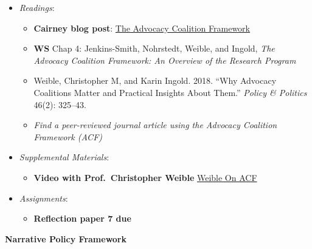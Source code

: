 \begin{itemize}

\item
  \emph{Readings}:

  \begin{itemize}
  
  \item
    \textbf{Cairney blog post}:
    \href{https://paulcairney.wordpress.com/2013/10/30/policy-concepts-in-1000-words-the-advocacy-coalition-framework/}{The
    Advocacy Coalition Framework}
  \item
    \textbf{WS} Chap 4: Jenkins-Smith, Nohrstedt, Weible, and Ingold,
    \emph{The Advocacy Coalition Framework: An Overview of the Research
    Program}
  \item
    Weible, Christopher M, and Karin Ingold. 2018. ``Why Advocacy
    Coalitions Matter and Practical Insights About Them.'' \emph{Policy
    \& Politics} 46(2): 325--43.
  \item
    \emph{Find a peer-reviewed journal article using the Advocacy
    Coalition Framework (ACF)}
  \end{itemize}
\item
  \emph{Supplemental Materials}:

  \begin{itemize}
  
  \item
    \faYoutube \hspace{0.005in} \textbf{Video with Prof.~Christopher
    Weible} \href{https://www.youtube.com/watch?v=-IXuncwc_kE}{Weible On
    ACF}
  \end{itemize}
\item
  \emph{Assignments}:

  \begin{itemize}
  
  \item
    \textbf{‌Reflection paper 7 due}
  \end{itemize}
\end{itemize}

\week \textbf{Narrative Policy Framework}

